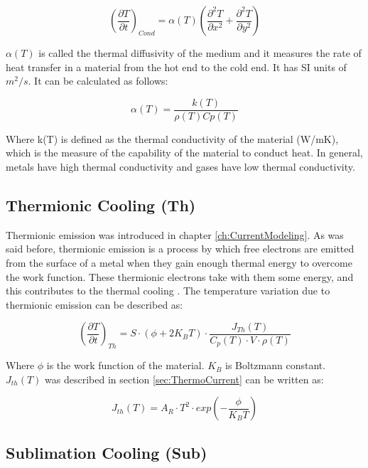 \begin{equation}
    \left( \frac{\partial T}{\partial t} \right)_{Cond} = \alpha (T) \left( \frac{\partial^2 T}{\partial x^2} + \frac{\partial^2 T}{\partial y^2} \right)
\end{equation}

$\alpha(T)$ is called the thermal diffusivity of the medium and it measures the rate of heat transfer in a material from the hot end to the cold end. It has SI units of $m^2 /s$. It can be calculated as follows: 

\begin{equation}
    \alpha(T) = \frac{k(T)}{\rho(T)Cp(T)}
\end{equation}

Where k(T) is defined as the thermal conductivity of the material (W/mK), which is the measure of the capability of the material to conduct heat. In general, metals have high thermal conductivity and gases have low thermal conductivity. 

\subsection{Thermionic Cooling (Th)}

Thermionic emission was introduced in chapter \ref{ch:CurrentModeling}. As was said before, thermionic emission is a process by which free electrons are emitted from the surface of a metal when they gain enough thermal energy to overcome the work function. These thermionic electrons take with them some energy, and this contributes to the thermal cooling \parencite[][]{ref:ThermoCooling}. The temperature variation due to thermionic emission can be described as: 

\begin{equation}
    \left(\frac{\partial T}{\partial t}\right)_{Th} = S\cdot \left( \phi +2K_B T\right)\cdot \frac{J_{Th}(T)}{C_p(T)\cdot V \cdot \rho(T)}
\end{equation}

Where $\phi$ is the work function of the material. $K_B$ is Boltzmann constant. $J_{th} (T)$ was described in section \ref{sec:ThermoCurrent} can be written as: 

\begin{equation}
    J_{th} (T) = A_R \cdot T^2\cdot exp\left(-\frac{\phi}{K_B T}\right)
\end{equation}

\subsection{Sublimation Cooling (Sub)}

